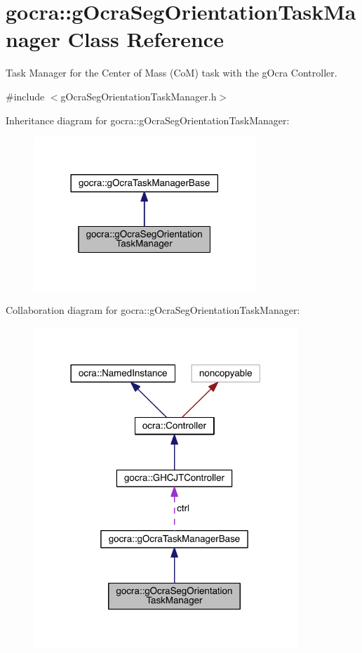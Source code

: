 \hypertarget{classgocra_1_1gOcraSegOrientationTaskManager}{}\section{gocra\+:\+:g\+Ocra\+Seg\+Orientation\+Task\+Manager Class Reference}
\label{classgocra_1_1gOcraSegOrientationTaskManager}


Task Manager for the Center of Mass (CoM) task with the g\+Ocra Controller.  




{\ttfamily \#include $<$g\+Ocra\+Seg\+Orientation\+Task\+Manager.\+h$>$}



Inheritance diagram for gocra\+:\+:g\+Ocra\+Seg\+Orientation\+Task\+Manager\+:\nopagebreak
\begin{figure}[H]
\begin{center}
\leavevmode
\includegraphics[width=237pt]{d0/d24/classgocra_1_1gOcraSegOrientationTaskManager__inherit__graph}
\end{center}
\end{figure}


Collaboration diagram for gocra\+:\+:g\+Ocra\+Seg\+Orientation\+Task\+Manager\+:\nopagebreak
\begin{figure}[H]
\begin{center}
\leavevmode
\includegraphics[width=282pt]{de/d46/classgocra_1_1gOcraSegOrientationTaskManager__coll__graph}
\end{center}
\end{figure}
